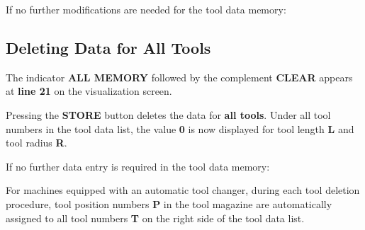 If no further modifications are needed for the tool data memory:

\begin{itemize}
\end{itemize}

\newpage

\subsection{Deleting Data for All Tools}

\begin{itemize}
    \vspace{.6cm}
    \vspace{.6cm}
    \vspace{.6cm}
\end{itemize}

\vspace{.5cm}
The indicator \textbf{ALL MEMORY} followed by the complement \textbf{CLEAR} appears at \textbf{line 21} on the visualization screen.

\begin{itemize}
\end{itemize}

\vspace{.5cm}
Pressing the \textbf{STORE} button deletes the data for \textbf{all tools}. Under all tool numbers in the tool data list, the value \textbf{0} is now displayed for tool length \textbf{L} and tool radius \textbf{R}.

If no further data entry is required in the tool data memory:

\begin{itemize}
\end{itemize}
\vspace{.5cm}
\notes

For machines equipped with an automatic tool changer, during each tool deletion procedure, tool position numbers \textbf{P} in the tool magazine are automatically assigned to all tool numbers \textbf{T} on the right side of the tool data list.

